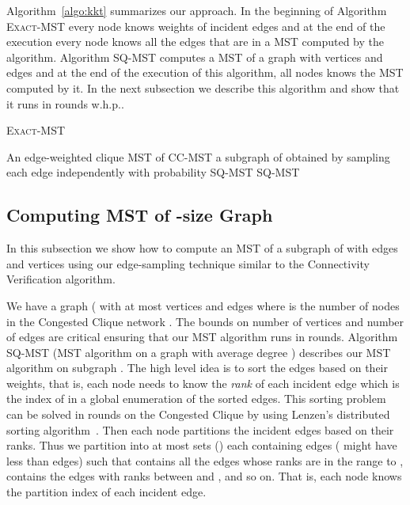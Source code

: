 \documentclass[11pt]{article}
\begin{document}
Algorithm~\ref{algo:kkt} summarizes our approach. 
In the beginning of Algorithm \textsc{Exact-MST} every node knows weights of incident edges and at the end of the execution every node knows all the edges that are in a MST computed by the algorithm. 
Algorithm \textsc{SQ-MST} computes a MST of a graph with  vertices and  edges and at the end of the execution of this algorithm, all nodes knows the MST computed by it.
In the next subsection we describe this algorithm and show that it runs in  rounds w.h.p.. 
\begin{algorithm}[H]
 \caption{\textsc{Exact-MST}\label{algo:kkt}}
 \begin{algorithmic}[1]
  \REQUIRE An edge-weighted clique 
  \ENSURE  MST of 
  \STATE   \textsc{CC-MST}
  \STATE     a subgraph of  obtained by sampling each edge independently with probability  
  \STATE    \textsc{SQ-MST}
\STATE    
  \STATE    \textsc{SQ-MST}
  \RETURN  
 \end{algorithmic}
\end{algorithm}

\subsection{Computing MST of -size Graph}
In this subsection we show how to compute an MST of a subgraph  of  with  edges and  vertices  using our edge-sampling technique similar to the Connectivity Verification algorithm.

We have a graph  ( with at most  vertices and  edges  where  is the number of nodes in the Congested Clique network .
The bounds on number of vertices and number of edges are critical ensuring that our MST algorithm runs in  rounds. 
Algorithm \textsc{SQ-MST} (MST algorithm on a graph with average degree ) describes our MST algorithm on subgraph . 
The high level idea is to sort the edges based on their weights, that is, 
each node needs to know the \emph{rank}  of each incident edge which is the index of  in a global enumeration of the sorted edges.
This sorting problem can be solved in  rounds on the Congested Clique by using Lenzen's distributed sorting algorithm~\cite{lenzen2013routing}. 
Then each node partitions the incident edges based on their ranks. 
Thus we partition  into at most  sets  () each containing  edges ( might have less than  edges) 
such that  contains all the edges whose ranks are in the range  to ,  contains the edges with ranks between  and , and so on. 
That is, each node knows the partition index of each incident edge. 
\end{document}
